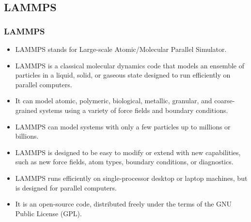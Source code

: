 \documentclass[slidestop,mathserif,compress,xcolor=svgnames]{beamer}
\begin{document}
\subsection{LAMMPS}
\begin{frame}
  \frametitle{\small LAMMPS}
  \begin{itemize}
    \item LAMMPS stands for Large-scale Atomic/Molecular Parallel Simulator.
    \item LAMMPS is a classical molecular dynamics code that models an ensemble of particles in a liquid, solid, or gaseous state designed to run efficiently on parallel computers.
    \item It can model atomic, polymeric, biological, metallic, granular, and coarse-grained systems using a variety of force fields and boundary conditions.
    \item LAMMPS can model systems with only a few particles up to millions or billions.
    \item LAMMPS is designed to be easy to modify or extend with new capabilities, such as new force fields, atom types, boundary conditions, or diagnostics.
    \item LAMMPS runs efficiently on single-processor desktop or laptop machines, but is designed for parallel computers.
    \item It is an open-source code, distributed freely under the terms of the GNU Public License (GPL).
  \end{itemize}
\end{frame}
\end{document}
